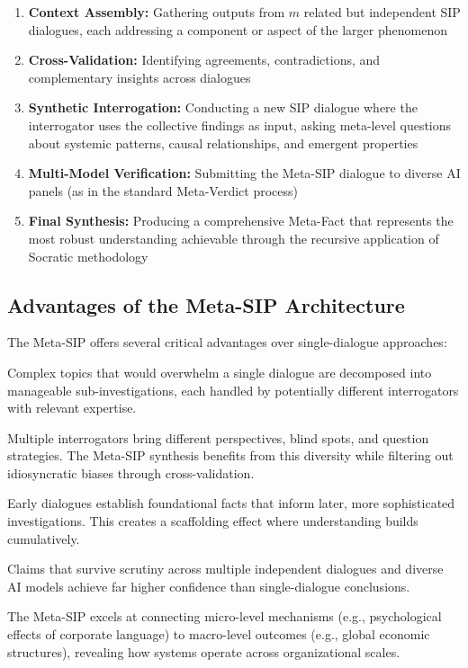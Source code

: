 \documentclass[11pt,a4paper]{article}
\begin{document}
\begin{enumerate}[leftmargin=*]
    \item \textbf{Context Assembly:} Gathering outputs from $m$ related but independent SIP dialogues, each addressing a component or aspect of the larger phenomenon
    \item \textbf{Cross-Validation:} Identifying agreements, contradictions, and complementary insights across dialogues
    \item \textbf{Synthetic Interrogation:} Conducting a new SIP dialogue where the interrogator uses the collective findings as input, asking meta-level questions about systemic patterns, causal relationships, and emergent properties
    \item \textbf{Multi-Model Verification:} Submitting the Meta-SIP dialogue to diverse AI panels (as in the standard Meta-Verdict process)
    \item \textbf{Final Synthesis:} Producing a comprehensive Meta-Fact that represents the most robust understanding achievable through the recursive application of Socratic methodology
\end{enumerate}

\subsection{Advantages of the Meta-SIP Architecture}

The Meta-SIP offers several critical advantages over single-dialogue approaches:

\begin{description}[style=nextline]
\item[\textbf{Distributed Cognitive Load:}] Complex topics that would overwhelm a single dialogue are decomposed into manageable sub-investigations, each handled by potentially different interrogators with relevant expertise.

\item[\textbf{Bias Diversification:}] Multiple interrogators bring different perspectives, blind spots, and question strategies. The Meta-SIP synthesis benefits from this diversity while filtering out idiosyncratic biases through cross-validation.

\item[\textbf{Iterative Depth:}] Early dialogues establish foundational facts that inform later, more sophisticated investigations. This creates a scaffolding effect where understanding builds cumulatively.

\item[\textbf{Falsification Robustness:}] Claims that survive scrutiny across multiple independent dialogues and diverse AI models achieve far higher confidence than single-dialogue conclusions.

\item[\textbf{Scale Integration:}] The Meta-SIP excels at connecting micro-level mechanisms (e.g., psychological effects of corporate language) to macro-level outcomes (e.g., global economic structures), revealing how systems operate across organizational scales.
\end{description}
\end{document}
